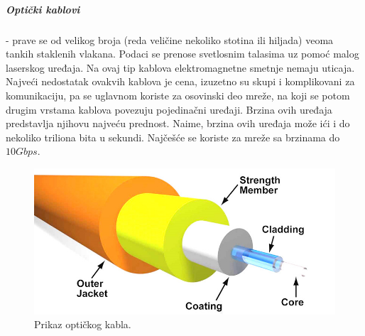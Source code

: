 \documentclass[a4paper]{article}
\begin{document}
\subparagraph{Optički kablovi}- prave se od velikog broja (reda veličine nekoliko stotina ili hiljada) veoma tankih staklenih vlakana. Podaci se prenose svetlosnim talasima uz pomoć malog laserskog uređaja. Na ovaj tip kablova elektromagnetne smetnje nemaju uticaja. Najveći nedostatak ovakvih kablova je cena, izuzetno su skupi i komplikovani za komunikaciju, pa se uglavnom koriste za osovinski deo mreže, na koji se potom drugim vrstama kablova povezuju pojedinačni uređaji. Brzina ovih uređaja predstavlja njihovu najveću prednost. Naime, brzina ovih uređaja može ići i do nekoliko triliona bita u sekundi. Najčešće se koriste za mreže sa brzinama do $10 Gbps$.
\begin{figure}[h!]
\begin{center}
\includegraphics[scale=0.5]{pictures/optical.jpg}
\end{center}
\caption{Prikaz optičkog kabla.}
\label{fig:optical}
\end{figure}
\end{document}
